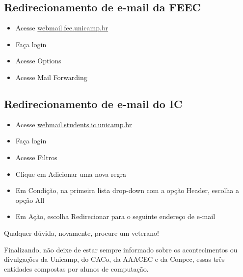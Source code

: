 \subsection{Redirecionamento de e-mail da FEEC}

\begin{itemize}
\item  Acesse \url{webmail.fee.unicamp.br}
\item  Faça login
\item  Acesse Options
\item  Acesse Mail Forwarding
\end{itemize}

\subsection{Redirecionamento de e-mail do IC}

\begin{itemize}
\item  Acesse \url{webmail.students.ic.unicamp.br}
\item  Faça login
\item  Acesse Filtros
\item  Clique em Adicionar uma nova regra
\item  Em Condição, na primeira lista drop-down com a opção Header, escolha a opção All
\item  Em Ação, escolha Redirecionar para o seguinte endereço de e-mail
\end{itemize}

Qualquer dúvida, novamente, procure um veterano!

Finalizando, não deixe de estar sempre informado sobre os acontecimentos ou
divulgações da Unicamp, do CACo, da AAACEC e da Conpec, essas três entidades
compostas por alunos de computação.
